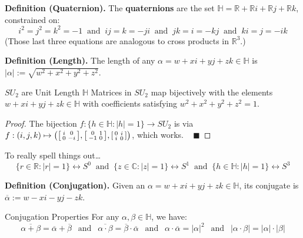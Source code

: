 \textbf{Definition (Quaternion).} The \textbf{quaternions} are the set $\mathbb{H} = \mathbb{R} + \mathbb{R}i + \mathbb{R}j + \mathbb{R}k$, constrained on:
\[ i^2 = j^2 = k^2 = -1 ~ \text{ and } ~ ij = k = -ji ~ \text{ and } ~ jk = i = -kj ~ \text{ and } ~ ki = j = -ik \]
(Those last three equations are analogous to cross products in $\mathbb{R}^3$.)

\textbf{Definition (Length).} The length of any $\alpha = w + xi + yj + zk \in \mathbb{H}$ is $|\alpha| := \sqrt{w^2 + x^2 + y^2 + z^2}$.

\begin{theorem}{$SU_2$ are Unit Length $\mathbb{H}$}
    Matrices in $SU_2$ map bijectively with the elements $w + xi + yj + zk \in \mathbb{H}$ with coefficients satisfying $w^2 + x^2 + y^2 + z^2 = 1$.
\end{theorem}

\begin{proof}
    The bijection $f: \{h \in \mathbb{H} : |h| = 1\} \to SU_2$ is via $f: (i, j, k) \mapsto \left(\begin{bsmallmatrix} i & 0 \\ 0 & -i \end{bsmallmatrix}, \begin{bsmallmatrix} 0 & 1 \\ -1 & 0 \end{bsmallmatrix}, \begin{bsmallmatrix} 0 & i \\ i & 0 \end{bsmallmatrix} \right)$, which works. ~ $\blacksquare$
\end{proof}

\begin{remark}
    To really spell things out\dots
    \[ \{r \in \mathbb{R}: |r| = 1 \} \leftrightarrow S^0 ~ \text{ and } ~ \{z \in \mathbb{C} : |z| = 1 \} \leftrightarrow S^1 ~ \text{ and } ~ \{h \in \mathbb{H} : |h| = 1 \} \leftrightarrow S^3 \]
\end{remark}
\textbf{Definition (Conjugation).} Given an $\alpha = w + xi + yj + zk \in \mathbb{H}$, its conjugate is $\overline{\alpha} := w - xi - yj - zk$.

\begin{theorem}{Conjugation Properties}
    For any $\alpha, \beta \in \mathbb{H}$, we have:
    \[ \overline{\alpha + \beta} = \overline{\alpha} + \overline{\beta} ~~ \text{ and } ~~ \overline{\alpha \cdot \beta} = \overline{\beta} \cdot \overline{\alpha} ~~ \text{ and } ~~ \alpha \cdot \overline{\alpha} = |\alpha|^2 ~~ \text{ and } ~~ |\alpha \cdot \beta| = |\alpha|  \cdot |\beta| \] \vspace{-0.85cm}
\end{theorem}

